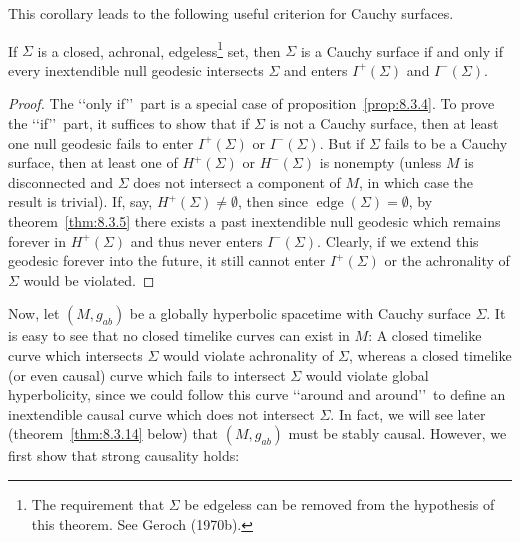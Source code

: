 This corollary leads to the following useful criterion for Cauchy surfaces.

\begin{theorem}\label{thm:8.3.7}
If \(\Sigma\) is a closed, achronal, edgeless\footnote{The requirement that
\(\Sigma\) be edgeless can be removed from the hypothesis of this theorem. See
Geroch (1970b).} set, then \(\Sigma\) is a Cauchy surface if and only if every
inextendible null geodesic intersects \(\Sigma\) and enters \(I^+(\Sigma)\) and
\(I^-(\Sigma)\).
\end{theorem}
\begin{proof}
The \lq\lq only if\rq\rq\ part is a special case of proposition~\ref{prop:8.3.4}. To
prove the \lq\lq if\rq\rq\ part, it suffices to show that if \(\Sigma\) is not a Cauchy
surface, then at least one null geodesic fails to enter \(I^+(\Sigma)\) or
\(I^-(\Sigma)\). But if \(\Sigma\) fails to be a Cauchy surface, then at least one of
\(H^+(\Sigma)\) or \(H^-(\Sigma)\) is nonempty (unless \(M\) is disconnected and
\(\Sigma\) does not intersect a component of \(M\), in which case the result is
trivial). If, say, \(H^+(\Sigma)\ne\emptyset\), then since
\(\operatorname{edge}(\Sigma)=\emptyset\), by theorem~\ref{thm:8.3.5} there exists
a past inextendible null geodesic which remains forever in \(H^+(\Sigma)\) and thus
never enters \(I^-(\Sigma)\). Clearly, if we extend this geodesic forever into the
future, it still cannot enter \(I^+(\Sigma)\) or the achronality of \(\Sigma\) would
be violated.
\end{proof}

Now, let \((M,g_{ab})\) be a globally hyperbolic spacetime with Cauchy surface
\(\Sigma\). It is easy to see that no closed timelike curves can exist in \(M\): A
closed timelike curve which intersects \(\Sigma\) would violate achronality of
\(\Sigma\), whereas a closed timelike (or even causal) curve which fails to intersect
\(\Sigma\) would violate global hyperbolicity, since we could follow this curve
\lq\lq around and around\rq\rq\ to define an inextendible causal curve which does not
intersect \(\Sigma\). In fact, we will see later (theorem~\ref{thm:8.3.14} below)
that \((M,g_{ab})\) must be stably causal. However, we first show that strong
causality holds:

